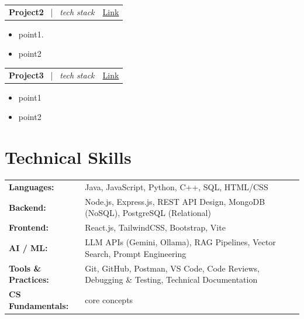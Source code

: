 \documentclass[a4paper,11pt]{article}
\begin{document}
\begin{tabularx}{\linewidth}{@{}X r@{}}
\textbf{Project2} \ | \ \textit{tech stack}
    & \href{link}{\small Link} \\
\end{tabularx}
\vspace{-6pt}
\begin{itemize}[nosep, leftmargin=1em, itemsep=2pt]
    \item {point1}.
    \item {point2}
\end{itemize}

\begin{tabularx}{\linewidth}{@{}X r@{}}
\textbf{Project3} \ | \ \textit{tech stack}
    & \href{link}{\small Link} \\
\end{tabularx}
\vspace{-6pt}
\begin{itemize}[nosep, leftmargin=1em, itemsep=2pt]
    \item {point1}
    \item {point2}
\end{itemize}

\section{Technical Skills}
\renewcommand{\arraystretch}{1.2}
\begin{tabularx}{\linewidth}{@{}l X@{}}
\textbf{Languages:} & \normalsize{Java, JavaScript, Python, C++, SQL, HTML/CSS}\\
\textbf{Backend:} & \normalsize{Node.js, Express.js, REST API Design, MongoDB (NoSQL), PostgreSQL (Relational)}\\
\textbf{Frontend:} & \normalsize{React.js, TailwindCSS, Bootstrap, Vite}\\
\textbf{AI / ML:} & \normalsize{LLM APIs (Gemini, Ollama), RAG Pipelines, Vector Search, Prompt Engineering}\\
\textbf{Tools \& Practices:} & \normalsize{Git, GitHub, Postman, VS Code, Code Reviews, Debugging \& Testing, Technical Documentation}\\
\textbf{CS Fundamentals:} & \normalsize{core concepts}\\
\end{tabularx}
\end{document}

